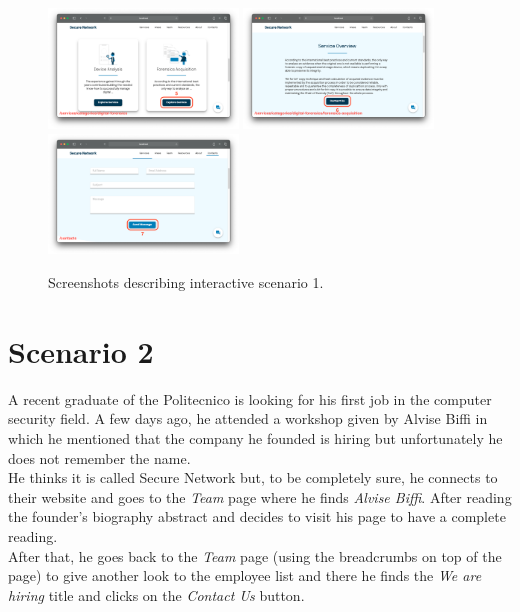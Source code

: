 \documentclass[12pt]{report}
\begin{document}
\begin{figure}[H]
	\centering
	\includegraphics[width=0.45\textwidth]{scenarios/1/5.png}
	\includegraphics[width=0.45\textwidth]{scenarios/1/6.png}
	\includegraphics[width=0.45\textwidth]{scenarios/1/7.png}
	\caption{Screenshots describing interactive scenario 1.}
\end{figure}

\clearpage
\section{Scenario 2}
A recent graduate of the Politecnico is looking for his first job in the computer security field.
A few days ago, he attended a workshop given by Alvise Biffi in which he mentioned that the company he founded is hiring but unfortunately he does not remember the name.\\
\noindent
He thinks it is called Secure Network but, to be completely sure, he connects to their website and goes to the \emph{Team} page where he finds \emph{Alvise Biffi}.
After reading the founder's biography abstract and decides to visit his page to have a complete reading. 
\\
\noindent
After that, he goes back to the \emph{Team} page (using the breadcrumbs on top of the page) to give another look to the employee list and there he finds the \emph{We are hiring} title and clicks on the \emph{Contact Us} button.
\end{document}
